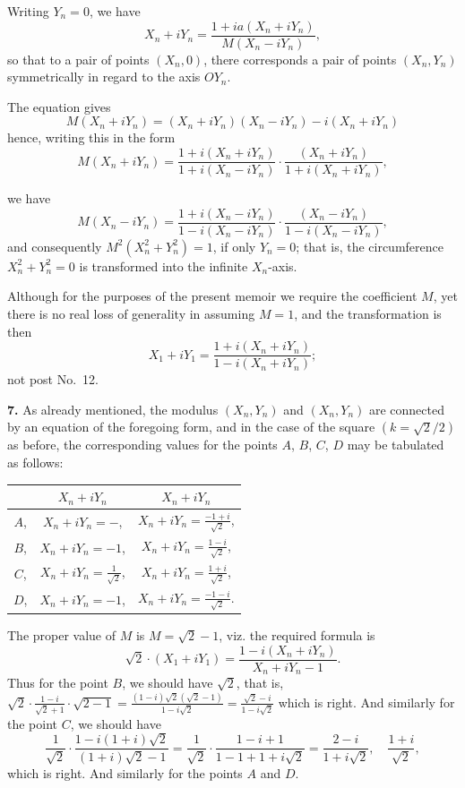 \documentclass[11pt,a4paper]{book}
\begin{document}
Writing $Y_n = 0$, we have
\[
X_n + iY_n = \frac{1 + ia(X_n + iY_n)}{M(X_n - iY_n)},
\]
so that to a pair of points $(X_n, 0)$, there corresponds a pair of points $(X_n, Y_n)$ symmetrically in regard to the axis $OY_n$.

The equation gives
\[
M(X_n + iY_n) = (X_n + iY_n)(X_n - iY_n) - i(X_n + iY_n)
\]
hence, writing this in the form
\[
M(X_n + iY_n) = \frac{1 + i(X_n + iY_n)}{1 + i(X_n - iY_n)} \cdot \frac{(X_n + iY_n)}{1 + i(X_n + iY_n)},
\]

we have
\[
M(X_n - iY_n) = \frac{1 + i(X_n - iY_n)}{1 - i(X_n - iY_n)} \cdot \frac{(X_n - iY_n)}{1 - i(X_n - iY_n)},
\]
and consequently $M^2(X_n^2 + Y_n^2) = 1$, if only $Y_n = 0$; that is, the circumference $X_n^2 + Y_n^2 = 0$ is transformed into the infinite $X_n$-axis.

Although for the purposes of the present memoir we require the coefficient $M$, yet there is no real loss of generality in assuming $M = 1$, and the transformation is then
\[
X_1 + iY_1 = \frac{1 + i(X_n + iY_n)}{1 - i(X_n + iY_n)};
\]
not post No.\ 12.

\textbf{7.} As already mentioned, the modulus $(X_n, Y_n)$ and $(X_n, Y_n)$ are connected by an equation of the foregoing form, and in the case of the square $(k = \sqrt{2}/2)$ as before, the corresponding values for the points $A$, $B$, $C$, $D$ may be tabulated as follows:
\begin{center}
\begin{tabular}{c|c|c}
& $X_n + iY_n$ & $X_n + iY_n$ \\
\hline
$A$, & $X_n + iY_n = -$, & $X_n + iY_n = \frac{- 1 + i}{\sqrt{2}}$, \\
$B$, & $X_n + iY_n = -1$, & $X_n + iY_n = \frac{1 - i}{\sqrt{2}}$, \\
$C$, & $X_n + iY_n = \frac{1}{\sqrt{2}}$, & $X_n + iY_n = \frac{1 + i}{\sqrt{2}}$, \\
$D$, & $X_n + iY_n = -1$, & $X_n + iY_n = \frac{- 1 - i}{\sqrt{2}}$. \\
\end{tabular}
\end{center}

The proper value of $M$ is $M = \sqrt{2} - 1$, viz. the required formula is
\[
\sqrt{2} \cdot (X_1 + iY_1) = \frac{1 - i(X_n + iY_n)}{X_n + iY_n - 1}.
\]
Thus for the point $B$, we should have $\sqrt{2}$, that is, $\sqrt{2} \cdot \frac{1 - i}{\sqrt{2} + 1} \cdot \sqrt{2 - 1} = \frac{(1 - i)\sqrt{2}(\sqrt{2} - 1)}{1 - i\sqrt{2}} = \frac{\sqrt{2} - i}{1 - i\sqrt{2}}$
which is right. And similarly for the point $C$, we should have
\[
\frac{1}{\sqrt{2}} \cdot \frac{1 - i(1 + i)\sqrt{2}}{(1 + i)\sqrt{2} - 1} = \frac{1}{\sqrt{2}} \cdot \frac{1 - i + 1}{1 - 1 + 1 + i\sqrt{2}} = \frac{2 - i}{1 + i\sqrt{2}}, \quad \frac{1 + i}{\sqrt{2}},
\]
which is right. And similarly for the points $A$ and $D$.
\end{document}
